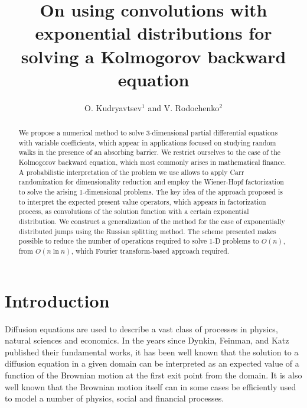\documentclass[a4paper]{jpconf}
\begin{document}
\title{On using convolutions with exponential distributions for solving a Kolmogorov backward equation}

\author{O. Kudryavtsev$^1$ and V. Rodochenko$^2$}

\address{$^1$ Russian Customs Academy Rostov branch, Budennovskiy 20, Rostov-on-Don 344002, Russia}
\address{$^2$ Institute for Mathematics, Mechanics, and Computer Science in the name of I.I. Vorovich (Southern Federal University), Milchakova str. 8a, Rostov-on-Don 344090, Russia}


\begin{abstract}
		We propose a numerical method to solve 3-dimensional partial differential equations with variable coefficients, which appear in applications focused on studying random walks in the presence of an absorbing barrier. We restrict ourselves to the case of the Kolmogorov backward equation, which most commonly arises in mathematical finance. A probabilistic interpretation of the problem we use allows to apply Carr randomization for dimensionality reduction and employ the Wiener-Hopf factorization to solve the arising 1-dimensional problems. The key idea of the approach proposed is to interpret the expected present value operators, which appears in factorization process, as convolutions of the solution function with a certain exponential distribution. We construct a generalization of the method  for the case of exponentially distributed jumps using the Russian splitting method. The scheme presented makes possible to reduce the number of operations required to solve 1-D problems to $O(n)$, from $O(n\ln{n})$, which Fourier transform-based approach required.
\end{abstract}

\section{Introduction}

Diffusion equations are used to describe a vast class of processes in physics, natural sciences and economics. In the years since Dynkin, Feinman, and Katz published their fundamental works, it has been well known that the solution to a diffusion equation in a given domain can be interpreted as an expected value of a function of the Brownian motion at the first exit point from the domain. It is also well known that the Brownian motion itself can in some cases be efficiently used to model a number of physics, social and financial processes. 
\end{document}
